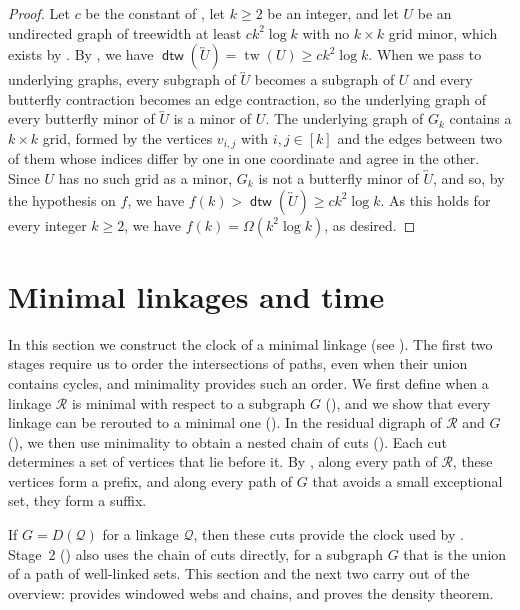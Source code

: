 \documentclass[fontsize=12pt,leading=14pt]{fullpaper}
\DeclareMathOperator{\dtw}{\mathsf{dtw}}
\newcommand{\Qcal}{\mathcal{Q}}
\newcommand{\Rcal}{\mathcal{R}}
\newcounter{step}
\begin{document}
\begin{proof}
  Let $c$ be the constant of , let $k\ge2$ be an integer, and let $U$ be an undirected graph of treewidth at least $ck^2\log k$ with no $k\times k$ grid minor, which exists by .
  By , we have $\dtw(\overleftrightarrow U)=\operatorname{tw}(U)\ge ck^2\log k$.
  When we pass to underlying graphs, every subgraph of $\overleftrightarrow U$ becomes a subgraph of $U$ and every butterfly contraction becomes an edge contraction, so the underlying graph of every butterfly minor of $\overleftrightarrow U$ is a minor of $U$.
  The underlying graph of $G_k$ contains a $k\times k$ grid, formed by the vertices $v_{i,j}$ with $i,j\in[k]$ and the edges between two of them whose indices differ by one in one coordinate and agree in the other.
  Since $U$ has no such grid as a minor, $G_k$ is not a butterfly minor of $\overleftrightarrow U$, and so, by the hypothesis on $f$, we have $f(k)>\dtw(\overleftrightarrow U)\ge ck^2\log k$.
  As this holds for every integer $k\ge2$, we have $f(k)=\Omega(k^2\log k)$, as desired.
\end{proof}

%
\section{Minimal linkages and time}\label{sec:time}

In this section we construct the clock of a minimal linkage (see ).
The first two stages require us to order the intersections of paths, even when their union contains cycles, and minimality provides such an order.
We first define when a linkage $\Rcal$ is minimal with respect to a subgraph $G$ (), and we show that every linkage can be rerouted to a minimal one ().
In the residual digraph of $\Rcal$ and $G$ (), we then use minimality to obtain a nested chain of cuts ().
Each cut determines a set of vertices that lie before it.
By , along every path of $\Rcal$, these vertices form a prefix, and along every path of $G$ that avoids a small exceptional set, they form a suffix.

If $G=D(\Qcal)$ for a linkage $\Qcal$, then these cuts provide the clock used by .
Stage~2 () also uses the chain of cuts directly, for a subgraph $G$ that is the union of a path of well-linked sets.
This section and the next two carry out  of the overview:  provides windowed webs and chains, and  proves the density theorem.
\end{document}
